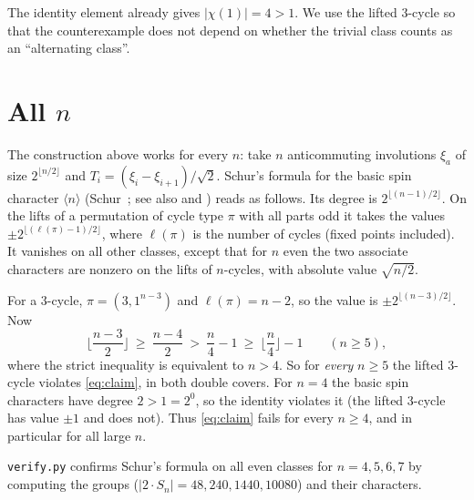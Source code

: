 \documentclass[11pt]{article}
\theoremstyle{remark}
\begin{document}
The identity element already gives $|\chi(1)|=4>1$. We use the lifted $3$-cycle so that the
counterexample does not depend on whether the trivial class counts as an ``alternating
class''.

\section{All \texorpdfstring{$n$}{n}}\label{sec:alln}
The construction above works for every $n$: take $n$ anticommuting involutions $\xi_a$ of size
$2^{\lfloor n/2\rfloor}$ and $T_i=(\xi_i-\xi_{i+1})/\sqrt2$. Schur's formula for the basic spin
character $\langle n\rangle$ (Schur~\cite{Schur}; see also \cite{Stembridge} and
\cite{HH}) reads as follows. Its degree is $2^{\lfloor (n-1)/2\rfloor}$. On the lifts of a
permutation of cycle type $\pi$ with all parts odd it takes the values
$\pm2^{\lfloor(\ell(\pi)-1)/2\rfloor}$, where $\ell(\pi)$ is the number of cycles (fixed points
included). It vanishes on all other classes, except that for $n$ even the two associate
characters are nonzero on the lifts of $n$-cycles, with absolute value $\sqrt{n/2}$.

For a $3$-cycle, $\pi=(3,1^{n-3})$ and $\ell(\pi)=n-2$, so the value is $\pm2^{\lfloor(n-3)/2\rfloor}$.
Now
\[
\Big\lfloor\frac{n-3}{2}\Big\rfloor\ \ge\ \frac{n-4}{2}\ >\ \frac n4-1\ \ge\ \Big\lfloor\frac n4\Big\rfloor-1
\qquad(n\ge5),
\]
where the strict inequality is equivalent to $n>4$. So for \emph{every} $n\ge5$ the lifted
$3$-cycle violates \eqref{eq:claim}, in both double covers. For $n=4$ the basic spin characters
have degree $2>1=2^{0}$, so the identity violates it (the lifted $3$-cycle has value $\pm1$ and does
not). Thus \eqref{eq:claim} fails for every $n\ge4$, and in particular for all large $n$.

\texttt{verify.py} confirms Schur's formula on all even classes for $n=4,5,6,7$ by computing the
groups ($|2\cdot S_n|=48,240,1440,10080$) and their characters.
\end{document}
